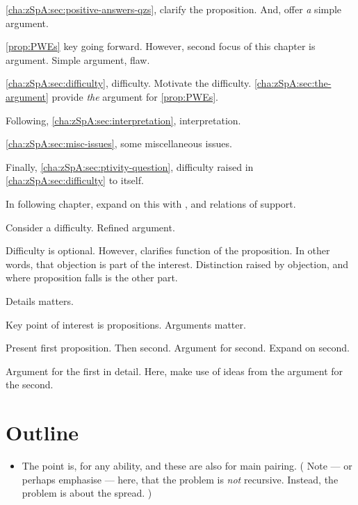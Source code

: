 \begin{note}
  \autoref{cha:zSpA:sec:positive-answers-qzs}, clarify the proposition.
  And, offer \emph{a} simple argument.

  \autoref{prop:PWEs} key going forward.
  However, second focus of this chapter is argument.
  Simple argument, flaw.

  \autoref{cha:zSpA:sec:difficulty}, difficulty.
  Motivate the difficulty.
  \autoref{cha:zSpA:sec:the-argument} provide \emph{the} argument for \autoref{prop:PWEs}.

  Following, \autoref{cha:zSpA:sec:interpretation}, interpretation.

  \autoref{cha:zSpA:sec:misc-issues}, some miscellaneous issues.

  Finally, \autoref{cha:zSpA:sec:ptivity-question}, difficulty raised in \autoref{cha:zSpA:sec:difficulty} to \qzS{} itself.
\end{note}

\begin{note}
  In following chapter, expand on this with , and relations of support.
\end{note}

\begin{note}
  Consider a difficulty.
  Refined argument.

  Difficulty is optional.
  However, clarifies function of the proposition.
  In other words, that objection is part of the interest.
  Distinction raised by objection, and where proposition falls is the other part.
\end{note}

\begin{note}
  Details matters.

  Key point of interest is propositions.
  Arguments matter.

  Present first proposition.
  Then second.
  Argument for second.
  Expand on second.

  Argument for the first in detail.
  Here, make use of ideas from the argument for the second.
\end{note}

\section{Outline}
\label{cha:zSpA:sec:outline}

\begin{note}
  \begin{itemize}
  \item
    The point is,  for any \abgen{} ability, and these are also  for main pairing.
    (%
    Note --- or perhaps emphasise --- here, that the problem is \emph{not} recursive.
    Instead, the problem is about the spread.%
    )
  \end{itemize}
\end{note}

